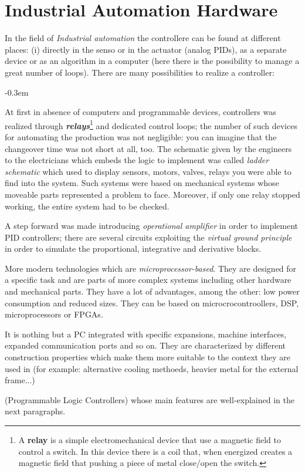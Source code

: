 \section{Industrial Automation Hardware}
In the field of \textit{Industrial automation} the controllere can be found at different places: (i) directly in the senso or in the actuator (analog PIDs), as a separate device or as an algorithm in a computer (here there is the possibility to manage a great number of loops). There are many possibilities to realize a controller: 
\begin{description}
    \itemsep-0.3em
    \item[Wired relay systems] At first in absence of computers and programmable devices, controllers was realized through \textit{\textbf{relays}}\footnote{
        A \textbf{relay} is a simple electromechanical device that use a magnetic field to control a switch. In this device there is a coil that, when energized creates a magnetic field that pushing a piece of metal close/open the switch.
    } and dedicated control loops; the number of such devices for automating the production was not negligible: you can imagine that the changeover time was not short at all, too. The schematic given by the engineers to the electricians which embeds the logic to implement was called \textit{ladder schematic} which used to display sensors, motors, valves, relays you were able to find into the system. Such systems were based on mechanical systems whose moveable parts represented a problem to face. Moreover, if only one relay stopped working, the entire system had to be checked.
    \item[Analog circuits] A step forward was made introducing \textit{operational amplifier} in order to implement PID controllers; there are several circuits exploiting the \textit{virtual ground principle} in order to simulate the proportional, integrative and derivative blocks.   
    \item[Embedded circuits] More modern technologies which are \textit{microprocessor-based}. They are designed for a specific task and are parts of more complex systems including other hardware and mechanical parts. They have a lot of advantages, among the other: low power consumption and reduced sizes. They can be based on microcrocontroollers, DSP, microprocessors or FPGAs.
    \item[Industrial PC] It is nothing but a PC integrated with specific expansions, machine interfaces, expanded communication ports and so on. They are characterized by different construction properties which make them more suitable to the context they are used in (for example: alternative cooling methoeds, heavier metal for the external frame...)
    \item[PLCs] (Programmable Logic Controllers) whose main features are well-explained in the next paragraphs. 
\end{description}

